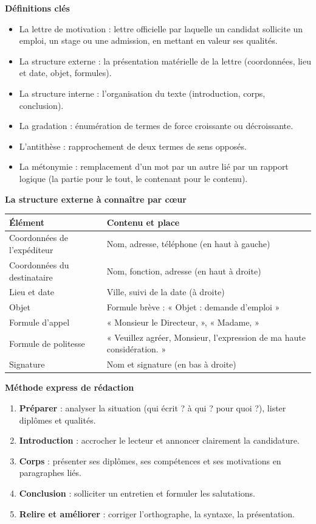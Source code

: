 \documentclass[11pt]{article}
\newcommand{\cle}[1]{{\popxbold\color{popdark}#1}}
\begin{document}
\begin{bilan}
\textbf{Définitions clés}
\begin{itemize}
\item La \cle{lettre de motivation} : lettre officielle par laquelle un candidat sollicite un emploi, un stage ou une admission, en mettant en valeur ses qualités.
\item La \cle{structure externe} : la présentation matérielle de la lettre (coordonnées, lieu et date, objet, formules).
\item La \cle{structure interne} : l'organisation du texte (introduction, corps, conclusion).
\item La \cle{gradation} : énumération de termes de force croissante ou décroissante.
\item L'\cle{antithèse} : rapprochement de deux termes de sens opposés.
\item La \cle{métonymie} : remplacement d'un mot par un autre lié par un rapport logique (la partie pour le tout, le contenant pour le contenu).
\end{itemize}

\textbf{La structure externe à connaître par cœur}
\begin{center}
\begin{tabularx}{\linewidth}{|l|X|}
\hline
\rowcolor{popblueL} \textbf{Élément} & \textbf{Contenu et place} \\
\hline
Coordonnées de l'expéditeur & Nom, adresse, téléphone (en haut à gauche) \\
\hline
Coordonnées du destinataire & Nom, fonction, adresse (en haut à droite) \\
\hline
Lieu et date & Ville, suivi de la date (à droite) \\
\hline
Objet & Formule brève : « Objet : demande d'emploi » \\
\hline
Formule d'appel & « Monsieur le Directeur, », « Madame, » \\
\hline
Formule de politesse & « Veuillez agréer, Monsieur, l'expression de ma haute considération. » \\
\hline
Signature & Nom et signature (en bas à droite) \\
\hline
\end{tabularx}
\end{center}

\textbf{Méthode express de rédaction}
\begin{enumerate}
\item \textbf{Préparer} : analyser la situation (qui écrit ? à qui ? pour quoi ?), lister diplômes et qualités.
\item \textbf{Introduction} : accrocher le lecteur et annoncer clairement la candidature.
\item \textbf{Corps} : présenter ses diplômes, ses compétences et ses motivations en paragraphes liés.
\item \textbf{Conclusion} : solliciter un entretien et formuler les salutations.
\item \textbf{Relire et améliorer} : corriger l'orthographe, la syntaxe, la présentation.
\end{enumerate}
\end{bilan}
\end{document}
